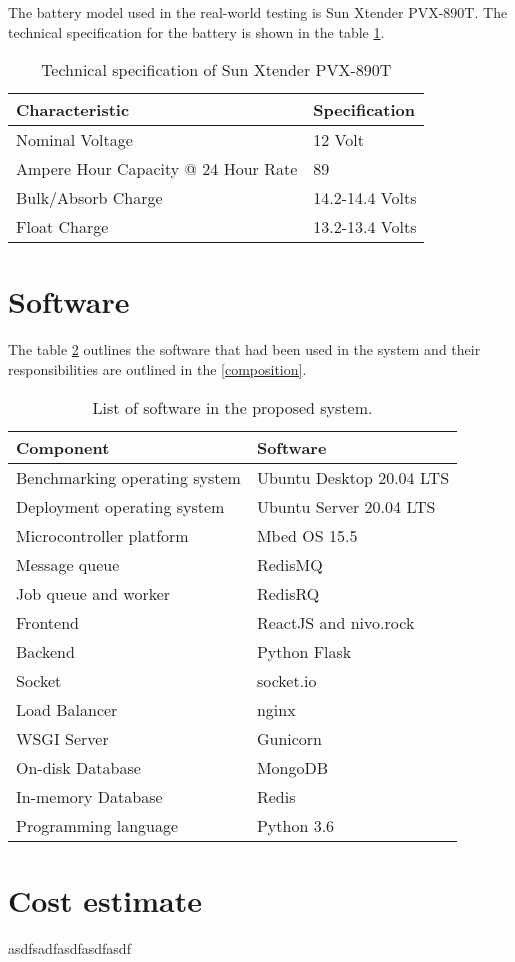 \documentclass[../thesis.tex]{subfiles}
\begin{document}
The battery model used in the real-world testing is Sun Xtender PVX-890T. The technical specification for the battery is shown in the table \ref{tab:pvx890t}. 

\begin{table}[h!]
	\begin{center}
		\caption{Technical specification of Sun Xtender PVX-890T}
		\label{tab:pvx890t}
		\begin{tabular}{l|l}
			\toprule
			\textbf{Characteristic} & \textbf{Specification}\\
			\midrule
			Nominal Voltage & 12 Volt\\
			Ampere Hour Capacity @ 24 Hour Rate & 89\\
			Bulk/Absorb Charge & 14.2-14.4 Volts\\
			Float Charge & 13.2-13.4 Volts\\
			\bottomrule
		\end{tabular}
	\end{center}
\end{table}

\section{Software}

The table \ref{tab:softwareList} outlines the software that had been used in the system and their responsibilities are outlined in the \autoref{composition}. 

\begin{table}[h!]
	\begin{center}
		\caption{List of software in the proposed system.}
		\label{tab:softwareList}
		\begin{tabular}{l|l}
			\toprule
			\textbf{Component} & \textbf{Software}\\
			\midrule
			Benchmarking operating system & Ubuntu Desktop 20.04 LTS\\
			Deployment operating system & Ubuntu Server 20.04 LTS\\
			Microcontroller platform & Mbed OS 15.5\\
			Message queue & RedisMQ\\
			Job queue and worker & RedisRQ\\
			Frontend & ReactJS and nivo.rock\\
			Backend & Python Flask\\
			Socket & socket.io\\
			Load Balancer & nginx\\
			WSGI Server & Gunicorn\\
			On-disk Database & MongoDB\\
			In-memory Database & Redis\\
			Programming language & Python 3.6\\
			\bottomrule
		\end{tabular}
	\end{center}
\end{table}

\section{Cost estimate}

asdfsadfasdfasdfasdf
\end{document}
